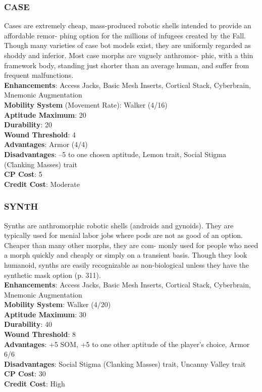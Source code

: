 \subsubsection{CASE}
Cases are extremely cheap, mass-produced robotic
shells intended to provide an affordable remor-
phing option for the millions of infugees created by
the Fall. Though many varieties of case bot models
exist, they are uniformly regarded as shoddy and
inferior. Most case morphs are vaguely anthromor-
phic, with a thin framework body, standing just
shorter than an average human, and suffer from
frequent malfunctions.
\\ \textbf{Enhancements}: Access Jacks, Basic Mesh Inserts, Cortical Stack, Cyberbrain, Mnemonic Augmentation
\\ \textbf{Mobility System} (Movement Rate): Walker (4/16)
\\ \textbf{Aptitude Maximum}: 20
\\ \textbf{Durability}: 20
\\ \textbf{Wound Threshold}: 4
\\ \textbf{Advantages}: Armor (4/4)
\\ \textbf{Disadvantages}: –5 to one chosen aptitude, Lemon trait,
Social Stigma (Clanking Masses) trait
\\ \textbf{CP Cost}: 5
\\ \textbf{Credit Cost}: Moderate

\subsubsection{SYNTH}
Synths are anthromorphic robotic shells (androids
and gynoids). They are typically used for menial
labor jobs where pods are not as good of an option.
Cheaper than many other morphs, they are com-
monly used for people who need a morph quickly
and cheaply or simply on a transient basis. Though
they look humanoid, synths are easily recognizable
as non-biological unless they have the synthetic mask
option (p. 311).
\\ \textbf{Enhancements}: Access Jacks, Basic Mesh Inserts, Cortical Stack, Cyberbrain, Mnemonic Augmentation
\\ \textbf{Mobility System}: Walker (4/20)
\\ \textbf{Aptitude Maximum}: 30
\\ \textbf{Durability}: 40
\\ \textbf{Wound Threshold}: 8
\\ \textbf{Advantages}: +5 SOM, +5 to one other aptitude of the
player’s choice, Armor 6/6
\\ \textbf{Disadvantages}: Social Stigma (Clanking Masses) trait,
Uncanny Valley trait
\\ \textbf{CP Cost}: 30
\\ \textbf{Credit Cost}: High

